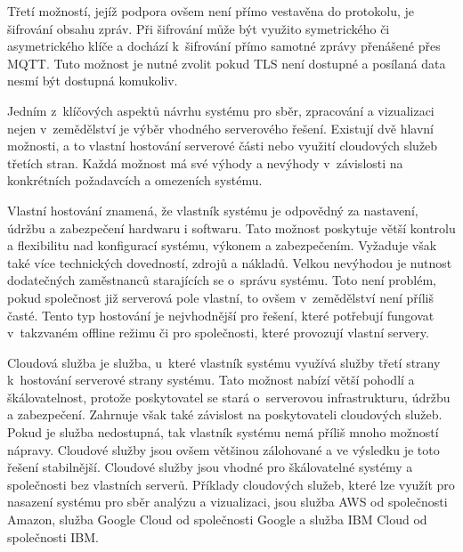 Třetí možností, jejíž podpora ovšem není přímo vestavěna do protokolu, je šifrování obsahu zpráv. Při šifrování může být využito symetrického či asymetrického klíče a dochází k~šifrování přímo samotné zprávy přenášené přes MQTT. Tuto možnost je nutné zvolit pokud TLS není dostupné a posílaná data nesmí být dostupná komukoliv.

Jedním z~klíčových aspektů návrhu systému pro sběr, zpracování a vizualizaci nejen v~zemědělství je výběr vhodného serverového řešení. Existují dvě hlavní možnosti, a to vlastní hostování serverové části nebo využití cloudových služeb třetích stran. Každá možnost má své výhody a nevýhody v~závislosti na konkrétních požadavcích a omezeních systému.

Vlastní hostování znamená, že vlastník systému je odpovědný za nastavení, údržbu a zabezpečení hardwaru i softwaru. Tato možnost poskytuje větší kontrolu a flexibilitu nad konfigurací systému, výkonem a zabezpečením. Vyžaduje však také více technických dovedností, zdrojů a nákladů. Velkou nevýhodou je nutnost dodatečných zaměstnanců starajících se o~správu systému. Toto není problém, pokud společnost již serverová pole vlastní, to ovšem v~zemědělství není příliš časté. Tento typ hostování je nejvhodnější pro řešení, které potřebují fungovat v~takzvaném offline režimu či pro společnosti, které provozují vlastní servery.

Cloudová služba je služba, u~které vlastník systému využívá služby třetí strany k~hostování serverové strany systému. Tato možnost nabízí větší pohodlí a škálovatelnost, protože poskytovatel se stará o~serverovou infrastrukturu, údržbu a zabezpečení. Zahrnuje však také závislost na poskytovateli cloudových služeb. Pokud je služba nedostupná, tak vlastník systému nemá příliš mnoho možností nápravy. Cloudové služby jsou ovšem většinou zálohované a ve výsledku je toto řešení stabilnější. Cloudové služby jsou vhodné pro škálovatelné systémy a společnosti bez vlastních serverů. Příklady cloudových služeb, které lze využít pro nasazení systému pro sběr analýzu a vizualizaci, jsou služba AWS od společnosti Amazon, služba Google Cloud od společnosti Google a služba IBM Cloud od společnosti IBM. \cite{HOSTING}


